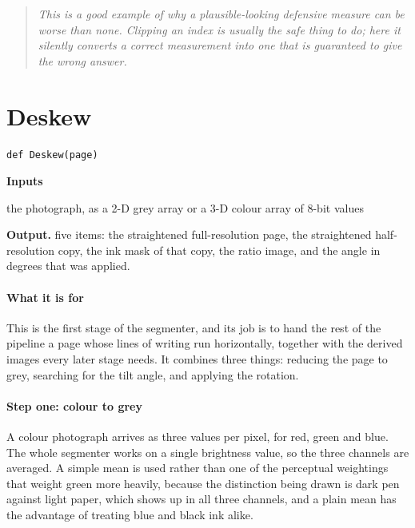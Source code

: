\begin{quote}\small\itshape This is a good example of why a plausible-looking defensive measure can be worse than none. Clipping an index is usually the safe thing to do; here it silently converts a correct measurement into one that is guaranteed to give the wrong answer.\end{quote}

\section{Deskew}
\begin{lstlisting}[style=sig]
def Deskew(page)
\end{lstlisting}

\noindent\textbf{Inputs}
\begin{description}[leftmargin=2.2em,style=nextline,font=\normalfont\ttfamily]\setlength\itemsep{1pt}
  \item[{page}] \normalfont the photograph, as a 2-D grey array or a 3-D colour array of 8-bit values
\end{description}

\noindent\textbf{Output.} five items: the straightened full-resolution page, the straightened half-resolution copy, the ink mask of that copy, the ratio image, and the angle in degrees that was applied.


\paragraph{What it is for}
This is the first stage of the segmenter, and its job is to hand the rest of the pipeline a page whose lines of writing run horizontally, together with the derived images every later stage needs. It combines three things: reducing the page to grey, searching for the tilt angle, and applying the rotation.


\paragraph{Step one: colour to grey}
A colour photograph arrives as three values per pixel, for red, green and blue. The whole segmenter works on a single brightness value, so the three channels are averaged. A simple mean is used rather than one of the perceptual weightings that weight green more heavily, because the distinction being drawn is dark pen against light paper, which shows up in all three channels, and a plain mean has the advantage of treating blue and black ink alike.


